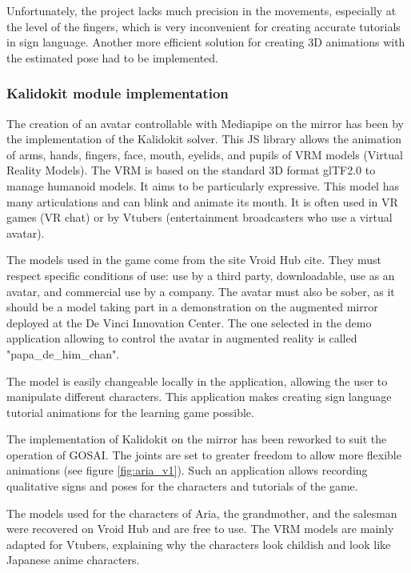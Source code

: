Unfortunately, the project lacks much precision in the movements, especially at the level of the fingers, which is very inconvenient for creating accurate tutorials in sign language. Another more efficient solution for creating 3D animations with the estimated pose had to be implemented.

\subsubsection{Kalidokit module implementation}

The creation of an avatar controllable with Mediapipe on the mirror has been by the implementation of the Kalidokit solver. This JS library allows the animation of arms, hands, fingers, face, mouth, eyelids, and pupils of VRM models (Virtual Reality Models). The VRM is based on the standard 3D format glTF2.0 to manage humanoid models. It aims to be particularly expressive. This model has many articulations and can blink and animate its mouth. It is often used in VR games (VR chat) or by Vtubers (entertainment broadcasters who use a virtual avatar).  

The models used in the game come from the site Vroid Hub cite\cite{vroid}. They must respect specific conditions of use: use by a third party, downloadable, use as an avatar, and commercial use by a company. The avatar must also be sober, as it should be a model taking part in a demonstration on the augmented mirror deployed at the De Vinci Innovation Center. The one selected in the demo application allowing to control the avatar in augmented reality is called "papa\_de\_him\_chan". 

The model is easily changeable locally in the application, allowing the user to manipulate different characters. This application makes creating sign language tutorial animations for the learning game possible.

The implementation of Kalidokit on the mirror has been reworked to suit the operation of GOSAI. The joints are set to greater freedom to allow more flexible animations (see figure \ref{fig:aria_v1}).
Such an application allows recording qualitative signs and poses for the characters and tutorials of the game.

The models used for the characters of Aria, the grandmother, and the salesman were recovered on Vroid Hub and are free to use. The VRM models are mainly adapted for Vtubers, explaining why the characters look childish and look like Japanese anime characters.

